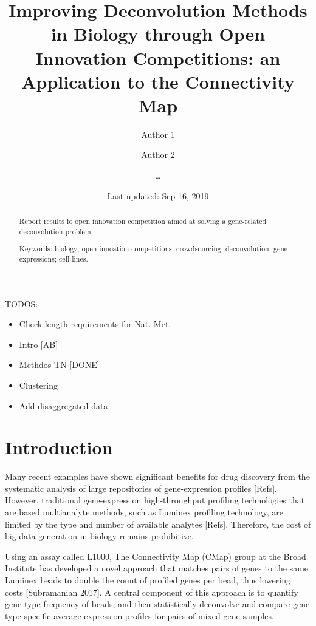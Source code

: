 \documentclass[]{article}
\title{Improving Deconvolution Methods in Biology through Open Innovation
Competitions: an Application to the Connectivity Map}
\author{Author 1 \and Author 2 \and \ldots{}}
\date{Last updated: Sep 16, 2019}
\providecommand{\tightlist}{%
  \setlength{\itemsep}{0pt}\setlength{\parskip}{0pt}}
\begin{document}
\maketitle
\begin{abstract}
Report results fo open innovation competition aimed at solving a
gene-related deconvolution problem.


\smallskip\noindent 
Keywords: biology; open innoation competitions; crowdsourcing; deconvolution; gene expressions; cell lines.
\end{abstract}

{
\setcounter{tocdepth}{2}
\newpage
\tableofcontents
\newpage
}
\color{red}

TODOS:

\begin{itemize}
\tightlist
\item
  Check length requirements for Nat. Met.
\item
  Intro {[}AB{]}
\item
  Methdos TN {[}DONE{]}
\item
  Clustering
\item
  Add disaggregated data
\end{itemize}

\color{black}

\hypertarget{introduction}{%
\section{Introduction}\label{introduction}}

Many recent examples have shown significant benefits for drug discovery
from the systematic analysis of large repositories of gene-expression
profiles {[}Refs{]}. However, traditional gene-expression
high-throughput profiling technologies that are based multianalyte
methods, such as Luminex profiling technology, are limited by the type
and number of available analytes {[}Refs{]}. Therefore, the cost of big
data generation in biology remains prohibitive.

Using an assay called L1000, The Connectivity Map (CMap) group at the
Broad Institute has developed a novel approach that matches pairs of
genes to the same Luminex beads to double the count of profiled genes
per bead, thus lowering costs {[}Subramanian 2017{]}. A central
component of this approach is to quantify gene-type frequency of beads,
and then statistically deconvolve and compare gene type-specific average
expression profiles for pairs of mixed gene samples.
\end{document}
